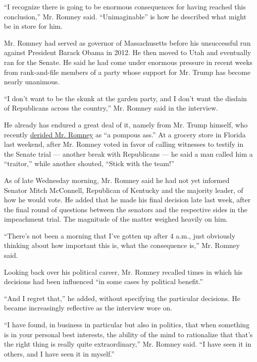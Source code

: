``I recognize there is going to be enormous consequences for having
reached this conclusion,'' Mr. Romney said. ``Unimaginable'' is how he
described what might be in store for him.

Mr. Romney had served as governor of Massachusetts before his
unsuccessful run against President Barack Obama in 2012. He then moved
to Utah and eventually ran for the Senate. He said he had come under
enormous pressure in recent weeks from rank-and-file members of a party
whose support for Mr. Trump has become nearly unanimous.

``I don't want to be the skunk at the garden party, and I don't want the
disdain of Republicans across the country,'' Mr. Romney said in the
interview.

He already has endured a great deal of it, namely from Mr. Trump
himself, who recently
\href{https://twitter.com/realDonaldTrump/status/1180487139546546182?ref_src=twsrc\%5Etfw\%7Ctwcamp\%5Etweetembed\&ref_url=https\%3A\%2F\%2Fwww.cnbc.com\%2F2019\%2F10\%2F05\%2Ftrump-slams-romney-as-pompous-ass-for-critique-of-ukraine-call.html}{derided
Mr. Romney} as ``a pompous ass.'' At a grocery store in Florida last
weekend, after Mr. Romney voted in favor of calling witnesses to testify
in the Senate trial --- another break with Republicans --- he said a man
called him a ``traitor,'' while another shouted, ``Stick with the
team!''

As of late Wednesday morning, Mr. Romney said he had not yet informed
Senator Mitch McConnell, Republican of Kentucky and the majority leader,
of how he would vote. He added that he made his final decision late last
week, after the final round of questions between the senators and the
respective sides in the impeachment trial. The magnitude of the matter
weighed heavily on him.

``There's not been a morning that I've gotten up after 4 a.m., just
obviously thinking about how important this is, what the consequence
is,'' Mr. Romney said.

Looking back over his political career, Mr. Romney recalled times in
which his decisions had been influenced ``in some cases by political
benefit.''

``And I regret that,'' he added, without specifying the particular
decisions. He became increasingly reflective as the interview wore on.

``I have found, in business in particular but also in politics, that
when something is in your personal best interests, the ability of the
mind to rationalize that that's the right thing is really quite
extraordinary,'' Mr. Romney said. ``I have seen it in others, and I have
seen it in myself.''


